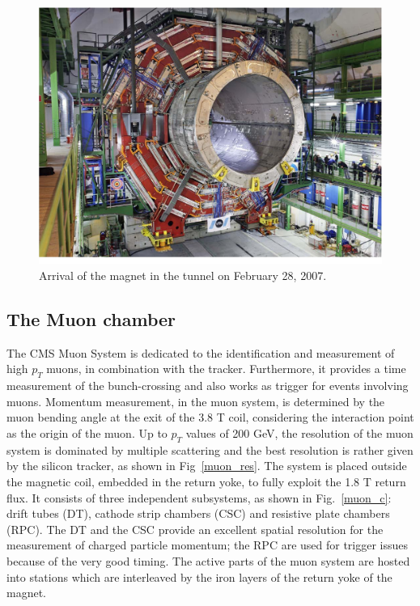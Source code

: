 \begin{figure}
\centering
\includegraphics[scale= 0.35]{../Cap2/magnet}
\caption{Arrival of the magnet in the tunnel on February 28, 2007.}
\label{magnetarrival}
\end{figure}

\subsection*{The Muon chamber}
The CMS Muon System  is dedicated to the identification and measurement of high
$p_T$ muons, in combination with the tracker. Furthermore, it provides a time measurement
of the bunch-crossing and also works as trigger for events involving muons. Momentum
measurement, in the muon system, is determined by the muon bending angle at the exit
of the 3.8 T coil, considering the interaction point as the origin of the muon. Up to $p_T$
values of 200 GeV, the resolution of the muon system is dominated by multiple scattering
and the best resolution is rather given by the silicon tracker, as
shown in Fig~\ref{muon_res}. The system is placed outside
the magnetic coil, embedded in the return yoke, to fully exploit the 1.8 T return flux. It
consists of three independent subsystems, as shown in Fig.~\ref{muon_c}: drift tubes (DT), cathode strip chambers (CSC) and resistive plate
chambers (RPC). The DT and the CSC provide an excellent spatial resolution for the
measurement of charged particle momentum; the RPC are used for trigger issues because
of the very good timing. The active parts of the muon system are hosted into stations
which are interleaved by the iron layers of the return yoke of the magnet. 

